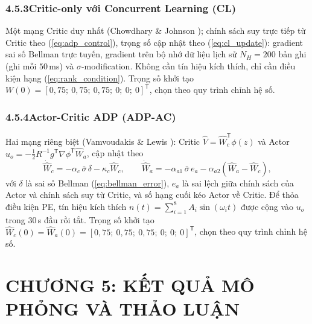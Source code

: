 \documentclass[12pt,a4paper]{article}
\makeatletter
\newcommand{\chapternum}{0}
\newcommand{\setchapter}[1]{%
  \renewcommand{\chapternum}{#1}%
  \setcounter{figure}{0}%
  \setcounter{table}{0}%
  \setcounter{equation}{0}%
  \renewcommand{\thefigure}{\chapternum.\arabic{figure}}%
  \renewcommand{\thetable}{\chapternum.\arabic{table}}%
  \renewcommand{\theequation}{\chapternum.\arabic{equation}}%
  \renewcommand{\theHfigure}{\chapternum.\arabic{figure}}%
  \renewcommand{\theHtable}{\chapternum.\arabic{table}}%
  \renewcommand{\theHequation}{\chapternum.\arabic{equation}}%
  \setcounter{dinhly}{0}\setcounter{bode}{0}\setcounter{hequa}{0}%
  \def\theHdinhly{\chapternum.\arabic{dinhly}}%
  \def\theHbode{\chapternum.\arabic{bode}}%
  \def\theHhequa{\chapternum.\arabic{hequa}}%
}
\newcommand{\seclabel}[2]{\phantomsection\protected@edef\@currentlabel{#2}\label{#1}}
\newcommand{\T}{\mathsf{T}}
\makeatother
\begin{document}
\subsubsection*{4.5.3\quad Critic-only với Concurrent Learning (CL)}
\seclabel{sec:cl}{4.5.3}

Một mạng Critic duy nhất (Chowdhary \& Johnson \cite{Chowdhary2010}); chính sách suy trực tiếp từ Critic theo (\ref{eq:adp_control}), trọng số cập nhật theo (\ref{eq:cl_update}): gradient sai số Bellman trực tuyến, gradient trên bộ nhớ dữ liệu lịch sử $N_H = 200$ bản ghi (ghi mỗi $50$\,ms) và $\sigma$-modification. Không cần tín hiệu kích thích, chỉ cần điều kiện hạng (\ref{eq:rank_condition}). Trọng số khởi tạo $W(0) = [0{,}75;\ 0{,}75;\ 0{,}75;\ 0;\ 0;\ 0]^\T$, chọn theo quy trình chỉnh hệ số.

\subsubsection*{4.5.4\quad Actor-Critic ADP (ADP-AC)}
\seclabel{sec:adpac}{4.5.4}

Hai mạng riêng biệt (Vamvoudakis \& Lewis \cite{Vamvoudakis2010}): Critic $\hat V = \hat W_c^\T\phi(z)$ và Actor $\hat u_o = -\frac12 R^{-1}g^\T\nabla\phi^\T\hat W_a$, cập nhật theo
\begin{equation}\label{eq:ac_update}
    \dot{\hat W}_c = -\alpha_c\,\bar\sigma\,\delta - \kappa_c\hat W_c, \qquad
    \dot{\hat W}_a = -\alpha_{a1}\,\bar\sigma\, e_a - \alpha_{a2}(\hat W_a - \hat W_c),
\end{equation}
với $\delta$ là sai số Bellman (\ref{eq:bellman_error}), $e_a$ là sai lệch giữa chính sách của Actor và chính sách suy từ Critic, và số hạng cuối kéo Actor về Critic. Để thỏa điều kiện PE, tín hiệu kích thích $n(t) = \sum_{i=1}^{8} A_i \sin(\omega_i t)$ được cộng vào $u_o$ trong 30\,s đầu rồi tắt. Trọng số khởi tạo $\hat W_c(0) = \hat W_a(0) = [0{,}75;\ 0{,}75;\ 0{,}75;\ 0;\ 0;\ 0]^\T$, chọn theo quy trình chỉnh hệ số.



\newpage
\setchapter{5}
\section*{CHƯƠNG 5: KẾT QUẢ MÔ PHỎNG VÀ THẢO LUẬN}
\end{document}
